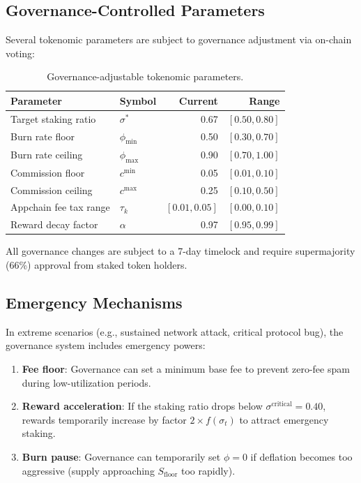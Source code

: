 \documentclass[11pt,a4paper]{article}
\begin{document}
\subsection{Governance-Controlled Parameters}

Several tokenomic parameters are subject to governance adjustment via on-chain voting:

\begin{table}[H]
\centering
\caption{Governance-adjustable tokenomic parameters.}
\label{tab:governance}
\begin{tabular}{llrr}
\toprule
\textbf{Parameter} & \textbf{Symbol} & \textbf{Current} & \textbf{Range} \\
\midrule
Target staking ratio & $\sigma^*$ & 0.67 & $[0.50, 0.80]$ \\
Burn rate floor & $\phi_{\min}$ & 0.50 & $[0.30, 0.70]$ \\
Burn rate ceiling & $\phi_{\max}$ & 0.90 & $[0.70, 1.00]$ \\
Commission floor & $c^{\min}$ & 0.05 & $[0.01, 0.10]$ \\
Commission ceiling & $c^{\max}$ & 0.25 & $[0.10, 0.50]$ \\
Appchain fee tax range & $\tau_k$ & $[0.01, 0.05]$ & $[0.00, 0.10]$ \\
Reward decay factor & $\alpha$ & 0.97 & $[0.95, 0.99]$ \\
\bottomrule
\end{tabular}
\end{table}

All governance changes are subject to a 7-day timelock and require supermajority (66\%) approval from staked token holders.

\subsection{Emergency Mechanisms}

In extreme scenarios (e.g., sustained network attack, critical protocol bug), the governance system includes emergency powers:

\begin{enumerate}
    \item \textbf{Fee floor}: Governance can set a minimum base fee to prevent zero-fee spam during low-utilization periods.
    \item \textbf{Reward acceleration}: If the staking ratio drops below $\sigma^{\text{critical}} = 0.40$, rewards temporarily increase by factor $2 \times f(\sigma_t)$ to attract emergency staking.
    \item \textbf{Burn pause}: Governance can temporarily set $\phi = 0$ if deflation becomes too aggressive (supply approaching $S_{\text{floor}}$ too rapidly).
\end{enumerate}
\end{document}
